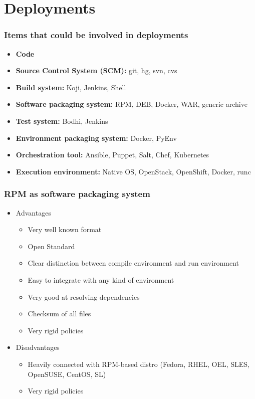 \documentclass[t,aspectratio=169]{beamer}
\begin{document}
\section{Deployments}
\begin{frame}
    \frametitle{Items that could be involved in deployments}
    \begin{itemize}
        \item<2-> \textbf{Code}
        \item<3-> \textbf{Source Control System (SCM):} git, hg, svn, cvs
        \item<4-> \textbf{Build system:} Koji, Jenkins, Shell
        \item<5-> \textbf{Software packaging system:} RPM, DEB, Docker, WAR, generic archive
        \item<6-> \textbf{Test system:} Bodhi, Jenkins
        \item<7-> \textbf{Environment packaging system:} Docker, PyEnv
        \item<8-> \textbf{Orchestration tool:} Ansible, Puppet, Salt, Chef, Kubernetes
        \item<9-> \textbf{Execution environment:} Native OS, OpenStack, OpenShift, Docker, runc
    \end{itemize}
\end{frame}

\begin{frame}
    \frametitle{RPM as software packaging system}
    \begin{itemize}
        \item<2-> Advantages
        \begin{itemize}
            \item<3-> Very well known format
            \item<4-> Open Standard
            \item<5-> Clear distinction between compile environment and run environment
            \item<6-> Easy to integrate with any kind of environment
            \item<7-> Very good at resolving dependencies
            \item<8-> Checksum of all files
            \item<9-> Very rigid policies
        \end{itemize}
        \item<10-> Disadvantages
        \begin{itemize}
            \item<11-> Heavily connected with RPM-based distro (Fedora, RHEL, OEL, SLES, OpenSUSE, CentOS, SL)
            \item<12-> Very rigid policies
        \end{itemize}
    \end{itemize}
\end{frame}
\end{document}
